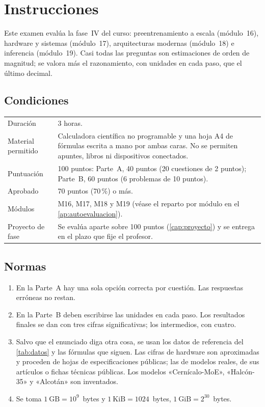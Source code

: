 \chapter*{Instrucciones}

Este examen evalúa la fase~IV del curso: preentrenamiento a escala (módulo~16), hardware y sistemas (módulo~17), arquitecturas modernas (módulo~18) e inferencia (módulo~19). Casi todas las preguntas son estimaciones de orden de magnitud; se valora más el razonamiento, con unidades en cada paso, que el último decimal.

\section*{Condiciones}
\begin{center}
\small
\begin{tabularx}{\textwidth}{@{}lX@{}}
\toprule
Duración & 3 horas. \\
Material permitido & Calculadora científica no programable y una hoja A4 de fórmulas escrita a mano por ambas caras. No se permiten apuntes, libros ni dispositivos conectados. \\
Puntuación & 100 puntos: Parte~A, 40 puntos (20 cuestiones de 2 puntos); Parte~B, 60 puntos (6 problemas de 10 puntos). \\
Aprobado & 70 puntos (70\,\%) o más. \\
Módulos & M16, M17, M18 y M19 (véase el reparto por módulo en el \cref{ap:autoevaluacion}). \\
Proyecto de fase & Se evalúa aparte sobre 100 puntos (\cref{cap:proyecto}) y se entrega en el plazo que fije el profesor. \\
\bottomrule
\end{tabularx}
\end{center}

\section*{Normas}
\begin{enumerate}[label=\arabic*.]
  \item En la Parte~A hay una sola opción correcta por cuestión. Las respuestas erróneas no restan.
  \item En la Parte~B deben escribirse las unidades en cada paso. Los resultados finales se dan con tres cifras significativas; los intermedios, con cuatro.
  \item Salvo que el enunciado diga otra cosa, se usan los datos de referencia del \cref{tab:datos} y las fórmulas que siguen. Las cifras de hardware son aproximadas y proceden de hojas de especificaciones públicas; las de modelos reales, de sus artículos o fichas técnicas públicas. Los modelos «Cernícalo-MoE», «Halcón-35» y «Alcotán» son inventados.
  \item Se toma $1~\text{GB}=10^{9}$~bytes y $1~\text{KiB}=1024$~bytes, $1~\text{GiB}=2^{30}$~bytes.
\end{enumerate}


